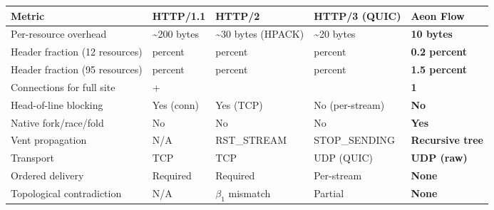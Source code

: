 \documentclass[
  11pt,
]{article}
\newcounter{none} %
\begin{document}
{\def\LTcaptype{none} %
\begin{longtable}[]{@{}
  >{\raggedright\arraybackslash}p{}
  >{\raggedright\arraybackslash}p{}
  >{\raggedright\arraybackslash}p{}
  >{\raggedright\arraybackslash}p{}
  >{\raggedright\arraybackslash}p{}@{}}
\toprule\noalign{}
\begin{minipage}[b]{\linewidth}\raggedright
Metric
\end{minipage} & \begin{minipage}[b]{\linewidth}\raggedright
HTTP/1.1
\end{minipage} & \begin{minipage}[b]{\linewidth}\raggedright
HTTP/2
\end{minipage} & \begin{minipage}[b]{\linewidth}\raggedright
HTTP/3 (QUIC)
\end{minipage} & \begin{minipage}[b]{\linewidth}\raggedright
Aeon Flow
\end{minipage} \\
\midrule\noalign{}
\endhead
\bottomrule\noalign{}
\endlastfoot
Per-resource overhead & \textasciitilde200 bytes & \textasciitilde30
bytes (HPACK) & \textasciitilde20 bytes & \textbf{10 bytes} \\
Header fraction (12 resources) & percent & percent & percent &
\textbf{0.2 percent} \\
Header fraction (95 resources) & percent & percent & percent &
\textbf{1.5 percent} \\
Connections for full site & 6+ & 1 & 1 & \textbf{1} \\
Head-of-line blocking & Yes (conn) & Yes (TCP) & No (per-stream) &
\textbf{No} \\
Native fork/race/fold & No & No & No & \textbf{Yes} \\
Vent propagation & N/A & RST\_STREAM & STOP\_SENDING & \textbf{Recursive
tree} \\
Transport & TCP & TCP & UDP (QUIC) & \textbf{UDP (raw)} \\
Ordered delivery & Required & Required & Per-stream & \textbf{None} \\
Topological contradiction & N/A & \(\beta_1\) mismatch & Partial &
\textbf{None} \\
\end{longtable}
}
\end{document}
